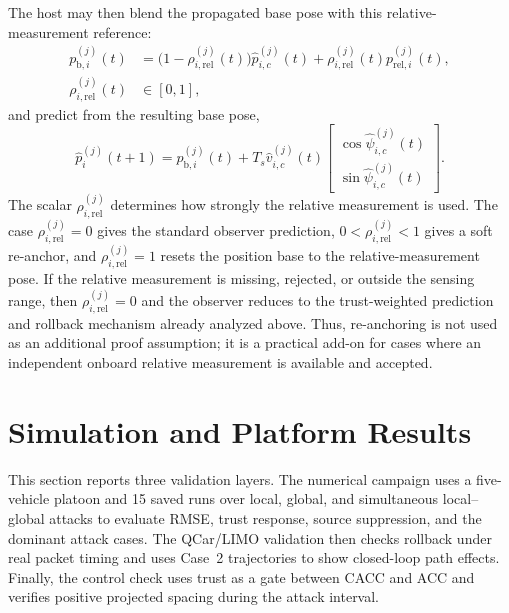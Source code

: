 \documentclass[letterpaper,journal]{IEEEtran}
\begin{document}
The host may then blend the propagated base pose with this relative-measurement reference:
\begin{equation}
\begin{aligned}
    p_{\mathrm b,i}^{(j)}(t)
    &=
    \big(1-\rho_{i,\mathrm{rel}}^{(j)}(t)\big)\hat p_{i,c}^{(j)}(t)
    +\rho_{i,\mathrm{rel}}^{(j)}(t)p_{\mathrm{rel},i}^{(j)}(t),
    \\
    \rho_{i,\mathrm{rel}}^{(j)}(t)&\in[0,1],
\end{aligned}
    \label{eq_pose_reanchor_base}
\end{equation}
and predict from the resulting base pose,
\begin{equation}
    \hat p_i^{(j)}(t+1)
    =
    p_{\mathrm b,i}^{(j)}(t)
    +T_s \hat v_{i,c}^{(j)}(t)
    \begin{bmatrix}
        \cos \hat\psi_{i,c}^{(j)}(t)\\
        \sin \hat\psi_{i,c}^{(j)}(t)
    \end{bmatrix}.
    \label{eq_pose_reanchor_prediction}
\end{equation}
The scalar $\rho_{i,\mathrm{rel}}^{(j)}$ determines how strongly the relative measurement is used. The case $\rho_{i,\mathrm{rel}}^{(j)}=0$ gives the standard observer prediction, $0<\rho_{i,\mathrm{rel}}^{(j)}<1$ gives a soft re-anchor, and $\rho_{i,\mathrm{rel}}^{(j)}=1$ resets the position base to the relative-measurement pose. If the relative measurement is missing, rejected, or outside the sensing range, then $\rho_{i,\mathrm{rel}}^{(j)}=0$ and the observer reduces to the trust-weighted prediction and rollback mechanism already analyzed above. Thus, re-anchoring is not used as an additional proof assumption; it is a practical add-on for cases where an independent onboard relative measurement is available and accepted.


\section{Simulation and Platform Results}\label{sec_simulation}

This section reports three validation layers. The numerical campaign uses a five-vehicle platoon and 15 saved runs over local, global, and simultaneous local--global attacks to evaluate RMSE, trust response, source suppression, and the dominant attack cases. The QCar/LIMO validation then checks rollback under real packet timing and uses Case~2 trajectories to show closed-loop path effects. Finally, the control check uses trust as a gate between CACC and ACC and verifies positive projected spacing during the attack interval.
\end{document}
